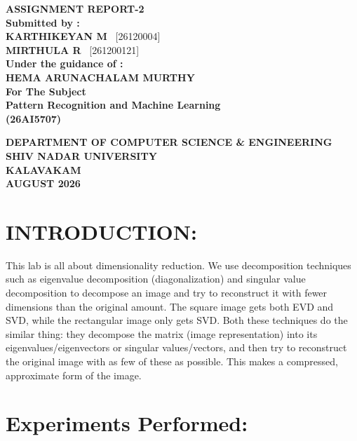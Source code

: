 \documentclass[12pt]{article}
\title{}
\date{}
\begin{document}
\begin{titlepage}
\centering
\vspace*{2cm}
{\Large \textbf{ASSIGNMENT REPORT-2}}\\[2cm]

\textbf{Submitted by :}\\[0.3cm]
\textbf{KARTHIKEYAN M} \ [26120004]\\[0.3cm]
\textbf{MIRTHULA R} \ [261200121]\\[2cm]

\textbf{Under the guidance of :}\\[0.3cm]
\textbf{HEMA ARUNACHALAM MURTHY}\\[1.5cm]

\textbf{For The Subject}\\[0.5cm]
{\Large \textbf{Pattern Recognition and Machine Learning}}\\[0.3cm]
\textbf{(26AI5707)}\\[3cm]

\vfill

\textbf{DEPARTMENT OF COMPUTER SCIENCE \& ENGINEERING}\\[0.3cm]
\textbf{SHIV NADAR UNIVERSITY}\\[0.3cm]
\textbf{KALAVAKAM}\\[1.5cm]

\textbf{AUGUST 2026}

\end{titlepage}

\section*{INTRODUCTION:}

This lab is all about dimensionality reduction. We use decomposition techniques
such as eigenvalue decomposition (diagonalization) and singular value
decomposition to decompose an image and try to reconstruct it with fewer
dimensions than the original amount. The square image gets both EVD and SVD,
while the rectangular image only gets SVD. Both these techniques do the similar thing: they decompose the matrix (image
representation) into its eigenvalues/eigenvectors or singular values/vectors,
and then try to reconstruct the original image with as few of these as
possible. This makes a compressed, approximate form of the image.

\section*{Experiments Performed:}
\end{document}

